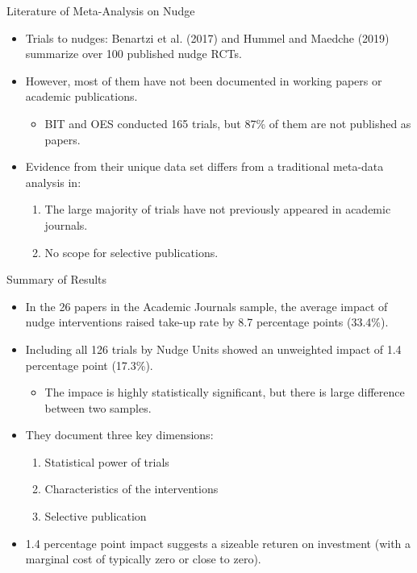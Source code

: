 \documentclass[dvipdfmx,11pt]{beamer}
\begin{document}
\begin{frame}{Literature of Meta-Analysis on Nudge}
  \begin{itemize}
    \item Trials to nudges: Benartzi et al. (2017) and Hummel and Maedche (2019) summarize over 100 published nudge RCTs.
    \item However, most of them have not been documented in working papers or academic publications.
    \begin{itemize}
      \item BIT and OES conducted 165 trials, but 87\% of them are not published as papers.
    \end{itemize}
    \item Evidence from their unique data set differs from a traditional meta-data analysis in:
    \begin{enumerate}
      \item The large majority of trials have not previously appeared in academic journals.
      \item No scope for selective publications.
    \end{enumerate}
  \end{itemize}
\end{frame}

\begin{frame}{Summary of Results}
  \begin{itemize}
    \item In the 26 papers in the Academic Journals sample, the average impact of nudge interventions raised take-up rate by 8.7 percentage points (33.4\%).
    \item Including all 126 trials by Nudge Units showed an unweighted impact of 1.4 percentage point (17.3\%).
    \begin{itemize}
      \item The impace is highly statistically significant, but there is large difference between two samples. 
    \end{itemize}
    \item They document three key dimensions:
    \begin{enumerate}
      \item Statistical power of trials
      \item Characteristics of the interventions
      \item Selective publication
    \end{enumerate}
    \item 1.4 percentage point impact suggests a sizeable returen on investment (with a marginal cost of typically zero or close to zero).
  \end{itemize}
\end{frame}
\end{document}

